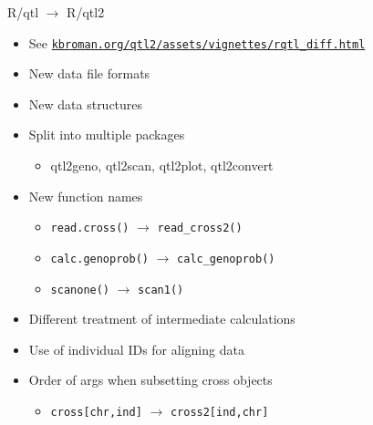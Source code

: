 \documentclass[12pt]{article}
\newcommand{\headsize}{\fontsize{35}{35} \selectfont}
\newcommand{\smallsize}{\fontsize{25}{30} \selectfont}
\newcommand{\smallersize}{\fontsize{20}{25} \selectfont}
\newcommand{\smallestsize}{\fontsize{18}{22} \selectfont}
\begin{document}
\newpage

\newpage

\headsize \color{myyellow}
\hfill\begin{minipage}{5.75in}
\centering
R/qtl $\rightarrow$ R/qtl2
\end{minipage}

\vspace{1cm}

\color{mywhite} \smallsize

\hfill \begin{minipage}[t]{9.5in}
\begin{itemize}
\setlength{\rightskip}{0pt plus 1fil} %
\item See
  \href{http://kbroman.org/qtl2/assets/vignettes/rqtl_diff.html}{\smallestsize
    \tt kbroman.org/qtl2/assets/vignettes/rqtl\_diff.html}
\item New data file formats
\item New data structures
\item Split into multiple packages
  \begin{itemize}
  \item[] {\color{myblue} \smallersize qtl2geno, qtl2scan, qtl2plot, qtl2convert}
  \end{itemize}
\item New function names
  \begin{itemize}
  \item[] {\color{myblue} \smallersize \verb|read.cross()| $\rightarrow$ \verb|read_cross2()|}
  \item[] {\color{myblue} \smallersize \verb|calc.genoprob()| $\rightarrow$ \verb|calc_genoprob()|}
  \item[] {\color{myblue} \smallersize \verb|scanone()| $\rightarrow$ \verb|scan1()|}
  \end{itemize}
\item Different treatment of intermediate calculations
\item Use of individual IDs for aligning data
\item Order of args when subsetting cross objects
  \begin{itemize}
  \item[] {\color{myblue} \smallersize \verb|cross[chr,ind]| $\rightarrow$ \verb|cross2[ind,chr]|}
  \end{itemize}
\end{itemize} \end{minipage}




\newpage
\end{document}
